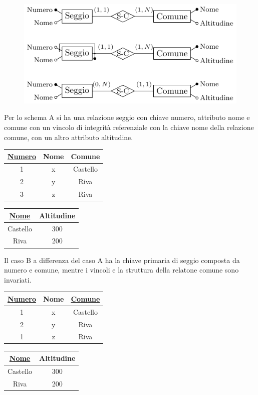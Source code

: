 \documentclass{article}
\numberwithin{equation}{subsection}
\begin{document}
\begin{figure}[H]%
    \centering%
    \includegraphics[scale=1.25]{schema_elezioni_25-11-24.pdf}%
\end{figure}

Per lo schema A si ha una relazione seggio con chiave numero, attributo nome e comune con un vincolo di integrità referenziale con la chiave nome 
della relazione comune, con un altro attributo altitudine. 
\begin{center}
    \begin{tabular}{|c|c|c|}
        \hline 
        \underline{Numero} & Nome & Comune\\
        \hline
        1 & x & Castello\\
        \hline
        2 & y & Riva\\
        \hline
        3 & z & Riva\\
        \hline
    \end{tabular}
    \begin{tabular}{|c|c|}
        \hline
        \underline{Nome} & Altitudine\\
        \hline
        Castello & 300\\
        \hline
        Riva & 200\\
        \hline
    \end{tabular}
\end{center}
Il caso B a differenza del caso A ha la chiave primaria di seggio composta da numero e comune, mentre i vincoli e la struttura della relatone 
comune sono invariati. 
\begin{center}
    \begin{tabular}{|c|c|c|}
        \hline 
        \underline{Numero} & Nome & \underline{Comune}\\
        \hline
        1 & x & Castello\\
        \hline
        2 & y & Riva\\
        \hline
        1 & z & Riva\\
        \hline
    \end{tabular}
    \begin{tabular}{|c|c|}
        \hline
        \underline{Nome} & Altitudine\\
        \hline
        Castello & 300\\
        \hline
        Riva & 200\\
        \hline
    \end{tabular}
\end{center}
\end{document}
